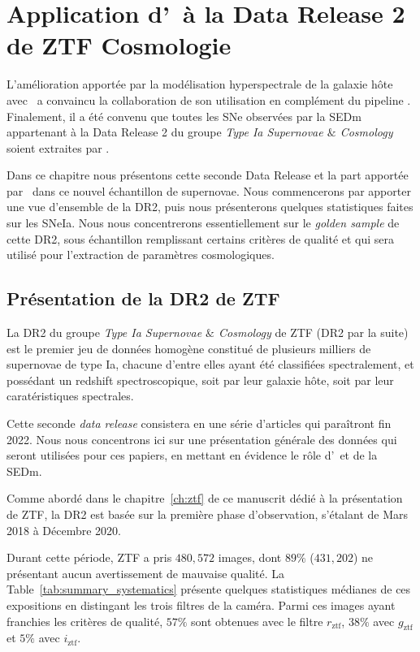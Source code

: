 \documentclass[../main/main.tex]{subfiles}
\begin{document}
\setcounter{chapter}{9}
\chapter{Application d'\hypergal\ à la Data Release 2 de ZTF Cosmologie}\label{ch:dr2}

\minitoc
\vspace{2cm}
L'amélioration apportée par la modélisation hyperspectrale de la galaxie
hôte avec \hypergal\ a convaincu la collaboration de son utilisation en
complément du pipeline \pysedm. Finalement, il a été convenu que toutes les SNe
observées par la SEDm appartenant à la Data Release 2 du groupe \textit{Type Ia Supernovae $\&$ Cosmology}
soient extraites par \hypergal.

Dans ce chapitre nous présentons cette seconde Data Release et la part apportée par \hypergal\ dans ce nouvel
échantillon de supernovae. Nous commencerons par apporter une vue
d'ensemble de la DR2, puis nous présenterons quelques statistiques
faites sur les SNeIa. Nous nous concentrerons essentiellement sur le
\textit{golden sample} de cette DR2,
sous échantillon remplissant certains critères de qualité et qui sera
utilisé pour l'extraction de paramètres cosmologiques.
\newpage

\section{Présentation de la DR2 de ZTF}

La DR2 du groupe \textit{Type Ia Supernovae $\&$ Cosmology} de ZTF (DR2
par la suite) est le premier jeu de données homogène constitué de plusieurs
milliers de supernovae de type Ia, chacune d'entre elles ayant été
classifiées spectralement, et possédant un redshift spectroscopique,
soit par leur galaxie hôte, soit par leur caratéristiques spectrales.

Cette seconde \textit{data release} consistera en une série d'articles qui
paraîtront fin 2022. Nous nous concentrons ici sur une présentation
générale des données qui seront utilisées pour ces papiers, en mettant
en évidence le rôle d'\hypergal\ et de la SEDm.

Comme abordé dans le chapitre~\ref{ch:ztf} de ce manuscrit dédié à la
présentation de ZTF, la DR2 est basée sur la première phase
d'observation, s'étalant de Mars 2018 à Décembre 2020.

Durant cette période, ZTF a pris $480,572$
images, dont $89\%$ ($431,202$) ne présentant aucun avertissement de
mauvaise qualité. La Table~\ref{tab:summary_systematics} présente quelques statistiques
médianes de ces expositions en distingant les trois filtres de la
caméra. Parmi ces images ayant franchies les critères de qualité, $57\%$ sont obtenues avec 
le filtre $r_{\text{ztf}}$, $38\%$ avec $g_{\text{ztf}}$ et $5\%$ avec $i_{\text{ztf}}$.
\end{document}
